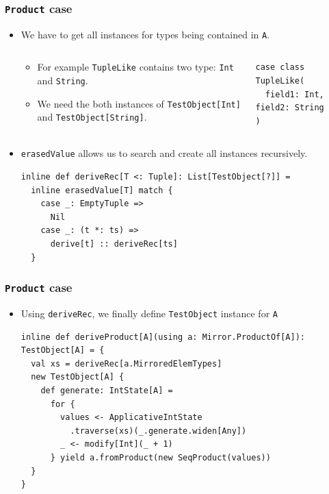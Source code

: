 \begin{frame}[fragile]
  \frametitle{ \lstinline|Product| case}
  
  \begin{itemize}
    \item We have to get all instances for types being contained in \lstinline|A|.
    \begin{columns}
      \begin{column}{0.6\textwidth}
        \begin{itemize}
          \item For example \lstinline|TupleLike| contains two type: \lstinline|Int| and \lstinline|String|.

          \item We need the both instances of \lstinline|TestObject[Int]| and \lstinline|TestObject[String]|.
        \end{itemize}
      \end{column}
      \begin{column}{0.3\textwidth}
\begin{lstlisting}[style=scala]
case class TupleLike(
  field1: Int, field2: String
)
\end{lstlisting}
      \end{column}
    \end{columns}

    \item \lstinline|erasedValue| allows us to search and create all instances recursively.
\begin{lstlisting}[style=scala]
inline def deriveRec[T <: Tuple]: List[TestObject[?]] =
  inline erasedValue[T] match {
    case _: EmptyTuple =>
      Nil
    case _: (t *: ts) =>
      derive[t] :: deriveRec[ts]
  }
\end{lstlisting}
  \end{itemize}
\end{frame}

\begin{frame}[fragile]
  \frametitle{ \lstinline|Product| case}
  
  \begin{itemize}
    \item Using \lstinline|deriveRec|, we finally define \lstinline|TestObject| instance for \lstinline|A|
\begin{lstlisting}[style=scala]
inline def deriveProduct[A](using a: Mirror.ProductOf[A]): TestObject[A] = {
  val xs = deriveRec[a.MirroredElemTypes]
  new TestObject[A] {
    def generate: IntState[A] =
      for {
        values <- ApplicativeIntState
          .traverse(xs)(_.generate.widen[Any])
        _ <- modify[Int](_ + 1)
      } yield a.fromProduct(new SeqProduct(values))
  }
}
\end{lstlisting}
  \end{itemize}
\end{frame}

